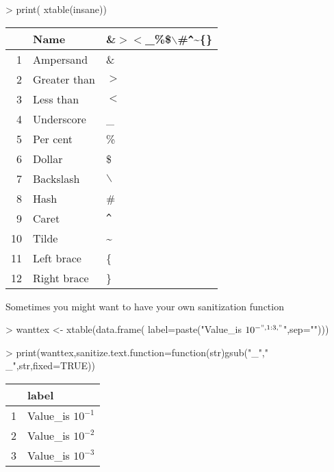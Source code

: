 \documentclass[letterpaper]{article}
\begin{document}
\begin{Schunk}
\begin{Sinput}
> print( xtable(insane))
\end{Sinput}
% latex table generated in R 3.1.1 by xtable 1.7-3 package
% 
\begin{table}[ht]
\centering
\begin{tabular}{rll}
  \hline
 & Name & \&$>$$<$\_\%\$$\backslash$\#\verb|^|\~{}\{\} \\ 
  \hline
1 & Ampersand & \& \\ 
  2 & Greater than & $>$ \\ 
  3 & Less than & $<$ \\ 
  4 & Underscore & \_ \\ 
  5 & Per cent & \% \\ 
  6 & Dollar & \$ \\ 
  7 & Backslash & $\backslash$ \\ 
  8 & Hash & \# \\ 
  9 & Caret & \verb|^| \\ 
  10 & Tilde & \~{} \\ 
  11 & Left brace & \{ \\ 
  12 & Right brace & \} \\ 
   \hline
\end{tabular}
\end{table}\end{Schunk}
Sometimes you might want to have your own sanitization function
\begin{Schunk}
\begin{Sinput}
> wanttex <- xtable(data.frame( label=paste("Value_is $10^{-",1:3,"}$",sep="")))
\end{Sinput}
\end{Schunk}
\begin{Schunk}
\begin{Sinput}
> print(wanttex,sanitize.text.function=function(str)gsub("_","\\_",str,fixed=TRUE))
\end{Sinput}
% latex table generated in R 3.1.1 by xtable 1.7-3 package
% 
\begin{table}[ht]
\centering
\begin{tabular}{rl}
  \hline
 & label \\ 
  \hline
1 & Value\_is $10^{-1}$ \\ 
  2 & Value\_is $10^{-2}$ \\ 
  3 & Value\_is $10^{-3}$ \\ 
   \hline
\end{tabular}
\end{table}\end{Schunk}
\end{document}
